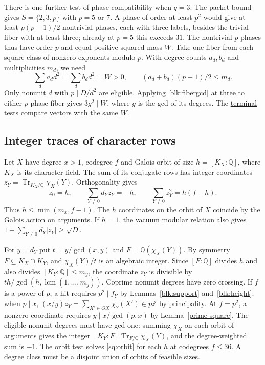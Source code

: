 \documentclass[11pt]{amsart}
\numberwithin{equation}{section}
\DeclareMathOperator{\lcm}{lcm}
\DeclareMathOperator{\Tr}{Tr}
\newcommand{\supfile}[2]{\href{https://github.com/sebastienpalcoux/WGT-fusion-categories/blob/433d1c45795202991f1693e00d9770e4cccf05f6/papers/rank-bound-supplement/#1}{#2}}
\begin{document}
There is one further test of phase compatibility when $q=3$. The packet
bound gives $S=\{2,3,p\}$ with $p=5$ or $7$. A phase of order at least
$p^2$ would give at least $p(p-1)/2$ nontrivial phases, each with three
labels, besides the trivial fiber with at least three; already at $p=5$
this exceeds $31$. The nontrivial $p$-phases thus have order $p$ and
equal positive squared mass $W$. Take one fiber from each square class
of nonzero exponents modulo $p$. With degree counts $a_d,b_d$ and
multiplicities $m_d$, we need
\[
 \sum_d a_d d^2=\sum_d b_d d^2=W>0,\qquad
 (a_d+b_d)(p-1)/2\le m_d .
\]
Only nonunit $d$ with $p\mid D/d^2$ are eligible. Applying
\eqref{blk:fibergcd} at three to either $p$-phase fiber gives
$3g^2\mid W$, where $g$ is the gcd of its degrees.
The \supfile{screen.py}{terminal tests} compare vectors with the same $W$.

\subsection{Integer traces of character rows}\label{sq:orbits}
Let $X$ have degree $x>1$, codegree $f$ and Galois orbit of size
$h=[K_X:\mathbb Q]$, where $K_X$ is its character field.
The sum of its conjugate rows has integer coordinates
$z_Y=\Tr_{K_X/\mathbb Q}\chi_X(Y)$. Orthogonality gives
\begin{equation}\label{sq:orbit}
 z_0=h,\qquad \sum_{Y\ne0}d_Yz_Y=-h,\qquad
              \sum_{Y\ne0}z_Y^2=h(f-h).
\end{equation}
Thus $h\le\min(m_x,f-1)$. The $h$ coordinates on the orbit of $X$
coincide by the Galois action on arguments. If $h=1$, the vacuum
modular relation also gives $1+\sum_{Y\ne0}d_Y|z_Y|\ge\sqrt D$.

For $y=d_Y$ put $t=y/\gcd(x,y)$ and $F=\mathbb Q(\chi_X(Y))$.
By symmetry $F\subseteq K_X\cap K_Y$, and $\chi_X(Y)/t$ is an
algebraic integer. Since $[F:\mathbb Q]$ divides $h$ and
also divides $[K_Y:\mathbb Q]\le m_y$, the coordinate $z_Y$ is divisible by
$t h/\gcd(h,\lcm(1,\ldots,m_y))$. Coprime nonunit degrees have
zero crossing. If $f$ is a power of $p$, a hit requires $p^2\mid f_Y$
by Lemmas~\ref{blk:support} and~\ref{blk:height}; when $p\mid x$,
$(x/y)z_Y=\sum_{X'\in GX}\chi_Y(X')\in p\mathbb Z$ by principality.
At $f=p^2$, a nonzero coordinate requires $y\mid x/\gcd(p,x)$
by Lemma~\ref{prime-square}. The eligible nonunit degrees must have
gcd one: summing $\chi_X$ on each orbit of arguments gives the integer
$[K_Y:F]\Tr_{F/\mathbb Q}\chi_X(Y)$, and the degree-weighted sum is $-1$.
The \supfile{trace.py}{orbit test} solves \eqref{sq:orbit} for each $h$
at codegrees $f\le36$. A degree class must be a disjoint union of orbits
of feasible sizes.
\end{document}
